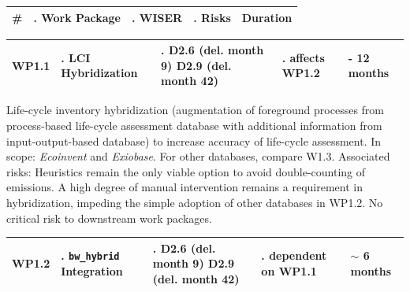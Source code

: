 \documentclass{article}
\begin{document}
    \begin{table}[H]
        \centering
        
        \begin{tabularx}{\linewidth}{
            |>{\hsize=0.25\hsize}X
            |>{\hsize=1.\hsize}X
            |>{\hsize=1.\hsize}X
            |>{\hsize=1.\hsize}X
            |>{\hsize=0.75\hsize}X|
          } %
            \hline
                \textbf{\#} & \textbf{Work Package} & \textbf{WISER} & \textbf{Risks} & \textbf{Duration}
            \\
            \hline
        \end{tabularx}
        
        \begin{tabularx}{\linewidth}{
            |>{\hsize=0.25\hsize}X
            |>{\hsize=1.\hsize}X
            |>{\hsize=1.\hsize}X
            |>{\hsize=1.\hsize}X
            |>{\hsize=0.75\hsize}X|
          } %
            \hline
                WP1.1
            &
                LCI Hybridization 
            &
                D2.6 (del. month 9) \newline D2.9 (del. month 42)
            &
                affects WP1.2
            &
                11 - 12 months
            \\
            \hline
        \end{tabularx}
        
    \end{table}
    \vspace*{-9pt}
    
    Life-cycle inventory hybridization (augmentation of foreground processes from process-based life-cycle assessment database with additional information from input-output-based database) to increase accuracy of life-cycle assessment. In scope: \textit{Ecoinvent} and \textit{Exiobase}. For other databases, compare W1.3. Associated risks: Heuristics remain the only viable option to avoid double-counting of emissions. A high degree of manual intervention remains a requirement in hybridization, impeding the simple adoption of other databases in WP1.2. No critical risk to downstream work packages.

    \begin{table}[H]
        \centering
        \begin{tabularx}{\linewidth}{
            |>{\hsize=0.25\hsize}X
            |>{\hsize=1.\hsize}X
            |>{\hsize=1.\hsize}X
            |>{\hsize=1.\hsize}X
            |>{\hsize=0.75\hsize}X|
          } %
            \hline
                WP1.2
            &
                \texttt{bw\_hybrid} Integration
            &
                D2.6 (del. month 9) \newline D2.9 (del. month 42)
            &
                dependent on WP1.1
            &
                $\sim$ 6 months
            \\
            \hline
        \end{tabularx}
    \end{table}
    \vspace*{-9pt}
    
\end{document}

